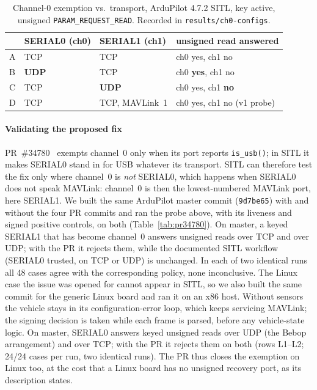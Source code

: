 \documentclass[conference]{IEEEtran}
\newcommand{\code}[1]{\texttt{#1}}
\begin{document}
\begin{table}[t]
\caption{Channel-0 exemption vs.\ transport, ArduPilot 4.7.2 SITL, key active,
unsigned \code{PARAM\_REQUEST\_READ}. Recorded in \code{results/ch0-configs}.}
\label{tab:ch0}
\centering\footnotesize
\setlength{\tabcolsep}{3.5pt}
\begin{tabular}{@{}llll@{}}
\toprule
 & SERIAL0 (ch0) & SERIAL1 (ch1) & unsigned read answered \\
\midrule
A & TCP & TCP & ch0 yes, ch1 no \\
B & \textbf{UDP} & TCP & ch0 \textbf{yes}, ch1 no \\
C & TCP & \textbf{UDP} & ch0 yes, ch1 \textbf{no} \\
D & TCP & TCP, MAVLink~1 & ch0 yes, ch1 no (v1 probe) \\
\bottomrule
\end{tabular}
\end{table}

\paragraph{Validating the proposed fix} PR~\#34780~\cite{ardupilot_pr34780}
exempts channel~0 only when its port reports \code{is\_usb()}; in SITL it makes
SERIAL0 stand in for USB whatever its transport. SITL can therefore test the fix
only where channel~0 is \emph{not} SERIAL0, which happens when SERIAL0 does not
speak MAVLink: channel~0 is then the lowest-numbered MAVLink port, here SERIAL1.
We built the same ArduPilot master commit (\code{9d7be65}) with and without the
four PR commits and ran the probe above, with its liveness and signed positive
controls, on both (Table~\ref{tab:pr34780}). On master, a keyed SERIAL1 that has
become channel~0 answers unsigned reads over TCP and over UDP; with the PR it
rejects them, while the documented SITL workflow (SERIAL0 trusted, on TCP or UDP)
is unchanged. In each of two identical runs all 48 cases agree with the
corresponding policy, none inconclusive. The Linux case the issue was opened
for cannot appear in SITL, so we also built the same commit for the generic Linux
board and ran it on an x86 host. Without sensors the vehicle stays in its
configuration-error loop, which keeps servicing MAVLink; the signing decision is
taken while each frame is parsed, before any vehicle-state logic. On master,
SERIAL0 answers keyed unsigned reads over UDP (the Bebop arrangement) and over
TCP; with the PR it rejects them on both (rows L1--L2; 24/24 cases per run, two
identical runs). The PR thus closes the exemption on Linux too, at the cost that
a Linux board has no unsigned recovery port, as its description states.
\end{document}

